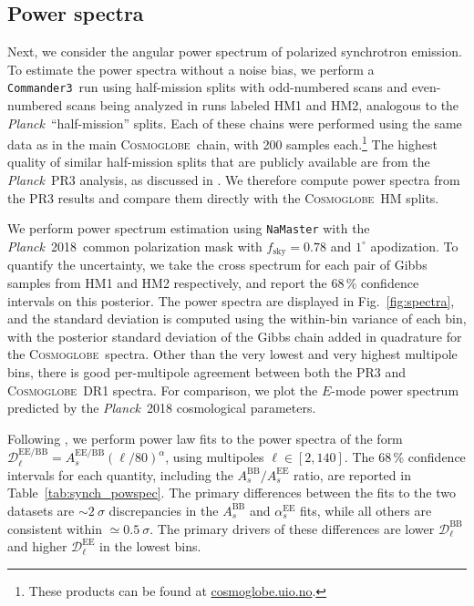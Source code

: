 \documentclass[twocolumn]{../../common/aa}
\def\Planck{\emph{Planck}}
\def\commanderthree{\texttt{Commander3}}
\newcommand{\cosmoglobe}{\textsc{Cosmoglobe}}
\begin{document}
\subsection{Power spectra}
\label{sec:powspec}


Next, we consider the angular power spectrum of polarized synchrotron emission. To estimate the power spectra without a noise bias, we perform a \commanderthree\ run using half-mission splits with odd-numbered scans and even-numbered scans being analyzed in runs labeled HM1 and HM2, analogous to the \Planck\ ``half-mission'' splits. Each of these chains were performed using the same data as in the main \cosmoglobe\ chain, with 200 samples each.\footnote{These products can be found at \url{cosmoglobe.uio.no}.}
The highest quality of similar half-mission splits that are publicly available are from the \Planck\ PR3 analysis, as discussed in \citet{planck2016-l04}. We therefore compute power spectra from the PR3 results and compare them directly with the \cosmoglobe\ HM splits.



We perform power spectrum estimation using \texttt{NaMaster} \citep{namaster} with the \Planck\ 2018\ common polarization mask with $f_\mathrm{sky}=0.78$ and $1^\circ$ apodization.
To quantify the uncertainty, we take the cross spectrum for each pair of Gibbs samples from HM1 and HM2 respectively, and report the 68\,\% confidence intervals on this posterior. The power spectra are displayed in Fig.~\ref{fig:spectra}, and the standard deviation is computed using the within-bin variance of each bin, with the posterior standard deviation of the Gibbs chain added in quadrature for the \cosmoglobe\ spectra.
Other than the very lowest and very highest multipole bins, there is good per-multipole agreement between both the PR3 and \cosmoglobe\ DR1 spectra. For comparison, we plot the $E$-mode power spectrum predicted by the \Planck\ 2018 cosmological parameters.

Following \citet{planck2016-l04}, we perform power law fits to the power spectra of the form $\mathcal D_\ell^\mathrm{EE/BB}=A_s^{\mathrm{EE/BB}}(\ell/80)^\alpha$, using multipoles $\ell\in[2,140]$. The 68\,\% confidence intervals for each quantity, including the $A_s^\mathrm{BB}/A_s^\mathrm{EE}$ ratio, are reported in Table~\ref{tab:synch_powspec}. The primary differences between the fits to the two datasets are $\sim2~\sigma$ discrepancies in the $A_s^\mathrm{BB}$ and $\alpha_s^\mathrm{EE}$ fits, while all others are consistent within $\simeq0.5~\sigma$. The primary drivers of these differences are lower $\mathcal D_\ell^\mathrm{BB}$ and higher $\mathcal D_\ell^\mathrm{EE}$ in the lowest bins.
\end{document}
